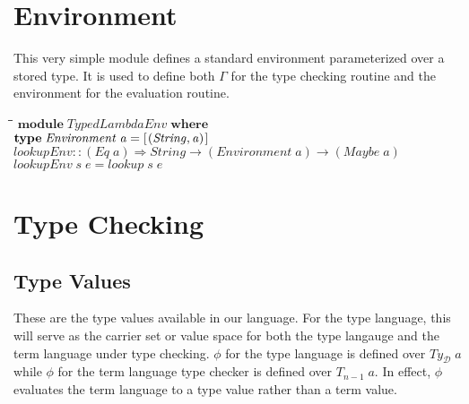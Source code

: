\documentclass[10pt]{article}
\newlength{\lwidth}\setlength{\lwidth}{4.5cm}
\newlength{\cwidth}\setlength{\cwidth}{8mm} %
\newcommand{\Conid}[1]{\mathit{#1}}
\newcommand{\Varid}[1]{\mathit{#1}}
\begin{document}
\section{Environment}

This very simple module defines a standard environment parameterized
over a stored type.  It is used to define both \ensuremath{\Varid{\Gamma}} for the type
checking routine and the environment for the evaluation routine.

\begin{tabbing}
\qquad\=\hspace{\lwidth}\=\hspace{\cwidth}\=\+\kill
${\mathbf{module}\;\Conid{TypedLambdaEnv}\;\mathbf{where}}$\\
${}$\\
${\mathbf{type}\;\Conid{Environment}\;\Varid{a}\mathrel{=}[\mskip1.5mu (\Conid{String},\Varid{a})\mskip1.5mu]}$\\
${}$\\
${\Varid{lookupEnv}\mathbin{::}(\Conid{Eq}\;\Varid{a})\Rightarrow \Conid{String}\to (\Conid{Environment}\;\Varid{a})\to (\Conid{Maybe}\;\Varid{a})}$\\
${\Varid{lookupEnv}\;\Varid{s}\;\Varid{e}\mathrel{=}\Varid{lookup}\;\Varid{s}\;\Varid{e}}$
\end{tabbing}
\section{Type Checking}

\subsection{Type Values}

These are the type values available in our language.  For the type
language, this will serve as the carrier set or value space for both
the type langauge and the term language under type checking.  \ensuremath{\Varid{\phi}}
for the type language is defined over \ensuremath{\Varid{Ty}_{\mathcal D}\;\Varid{a}} while \ensuremath{\Varid{\phi}} for the term
language type checker is defined over \ensuremath{\Varid{T}_{n-1}\;\Varid{a}}.  In effect, \ensuremath{\Varid{\phi}}
evaluates the term language to a type value rather than a term value.
\end{document}
